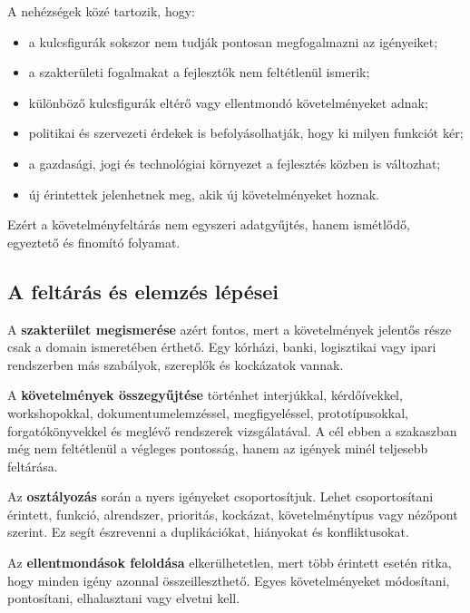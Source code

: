 A nehézségek közé tartozik, hogy:

\begin{itemize}
  \item a kulcsfigurák sokszor nem tudják pontosan megfogalmazni az igényeiket;
  \item a szakterületi fogalmakat a fejlesztők nem feltétlenül ismerik;
  \item különböző kulcsfigurák eltérő vagy ellentmondó követelményeket adnak;
  \item politikai és szervezeti érdekek is befolyásolhatják, hogy ki milyen funkciót kér;
  \item a gazdasági, jogi és technológiai környezet a fejlesztés közben is változhat;
  \item új érintettek jelenhetnek meg, akik új követelményeket hoznak.
\end{itemize}

Ezért a követelményfeltárás nem egyszeri adatgyűjtés, hanem ismétlődő, egyeztető és finomító folyamat.

\subsection{A feltárás és elemzés lépései}

\begin{center}

\end{center}



A \textbf{szakterület megismerése} azért fontos, mert a követelmények jelentős része csak a domain ismeretében érthető. Egy kórházi, banki, logisztikai vagy ipari rendszerben más szabályok, szereplők és kockázatok vannak.

A \textbf{követelmények összegyűjtése} történhet interjúkkal, kérdőívekkel, workshopokkal, dokumentumelemzéssel, megfigyeléssel, prototípusokkal, forgatókönyvekkel és meglévő rendszerek vizsgálatával. A cél ebben a szakaszban még nem feltétlenül a végleges pontosság, hanem az igények minél teljesebb feltárása.

Az \textbf{osztályozás} során a nyers igényeket csoportosítjuk. Lehet csoportosítani érintett, funkció, alrendszer, prioritás, kockázat, követelménytípus vagy nézőpont szerint. Ez segít észrevenni a duplikációkat, hiányokat és konfliktusokat.

Az \textbf{ellentmondások feloldása} elkerülhetetlen, mert több érintett esetén ritka, hogy minden igény azonnal összeilleszthető. Egyes követelményeket módosítani, pontosítani, elhalasztani vagy elvetni kell.

